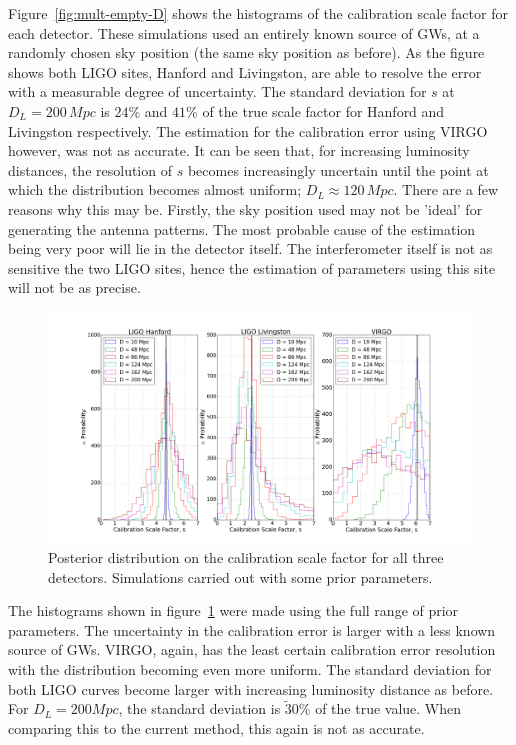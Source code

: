 \documentclass[12pt]{iopart}
\begin{document}
Figure~\ref{fig:mult-empty-D} shows the histograms of the calibration scale
factor for each detector. These simulations used an entirely known source of
GWs, at a randomly chosen sky position (the same sky position as before). As
the figure shows both LIGO sites, Hanford and Livingston, are able to resolve
the error with a measurable degree of uncertainty. The standard deviation for
$s$ at $D_{L}=200\,Mpc$ is $24\%$ and $41\%$ of the true scale factor for
Hanford and Livingston respectively. The estimation for the calibration error
using VIRGO however, was not as accurate. It can be seen that, for increasing
luminosity distances, the resolution of $s$ becomes increasingly uncertain
until the point at which the distribution becomes almost uniform; $D_{L}
\approx 120\,Mpc$. There are a few reasons why this may be. Firstly, the sky
position used may not be 'ideal' for generating the antenna patterns. The most
probable cause of the estimation being very poor will lie in the detector
itself. The interferometer itself is not as sensitive the two LIGO sites, hence
the estimation of parameters using this site will not be as precise.

\begin{figure}
  \centering
  \includegraphics[width = \textwidth]{MD_non_empty_D10_200}
  \caption{Posterior distribution on the calibration scale factor for
all three detectors. Simulations carried out with some prior parameters.}
  \label{fig:mult-non-D}
\end{figure}


The histograms shown in figure~\ref{fig:mult-non-D} were made using the full
range of prior parameters. The uncertainty in the calibration error is larger
with a less known source of GWs. VIRGO, again, has the least certain
calibration error resolution with the distribution becoming even more uniform.
The standard deviation for both LIGO curves become larger with increasing
luminosity distance as before. For $D_{L} = 200Mpc$,  the standard deviation is
$\tilde 30\%$ of the true value. When comparing this to the current method,
this again is not as accurate.
\end{document}

